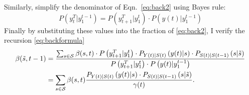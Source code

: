 \documentclass[]{article}
\newcommand{\ts}[3]{#1_{#2}^{#3}}                    %
\newcommand{\ti}[2]{{#1}{(#2)}}                  %
\newcommand{\states}{{\cal S}}
\begin{document}
Similarly, simplify the denominator of Eqn.~\eqref{eq:back2} using
Bayes rule:
\begin{equation*}
  P \left(\ts{y}{t}{T}|\ts{y}{1}{t-1} \right) = P
  \left(\ts{y}{t+1}{T}|\ts{y}{1}{t}  \right) \cdot {P \left(
  \ti{y}{t}|\ts{y}{1}{t-1}\right)}
\end{equation*}
Finally by substituting these values into the fraction of
\eqref{eq:back2}, I verify the recursion \eqref{eq:backformula}
\begin{align}
  \label{eq:back3} \beta({\tilde s},t-1) &= \frac{\sum_{s\in\states}
    \beta(s,t) \cdot P \left(\ts{y}{t+1}{T}|\ts{y}{1}{t} \right)
    \cdot P_{\ti{Y}{t}|\ti{S}{t}} \left(\ti{y}{t}|s \right) \cdot
    P_{\ti{S}{t}|\ti{S}{t-1}} \left(s|{\tilde s} \right)} {P
    \left(\ts{y}{t+1}{T}|\ts{y}{1}{t} \right) \cdot {P \left(
        \ti{y}{t}|\ts{y}{1}{t-1}\right)}} \\
  \label{eq:back4} &= \sum_{s\in\states} \beta(s,t) \frac{
    P_{\ti{Y}{t}|\ti{S}{t}} \left(\ti{y}{t}|s \right) \cdot
    P_{\ti{S}{t}|\ti{S}{t-1}} \left(s|{\tilde s} \right)} {\ti{\gamma}{t}}.
\end{align}
\end{document}

